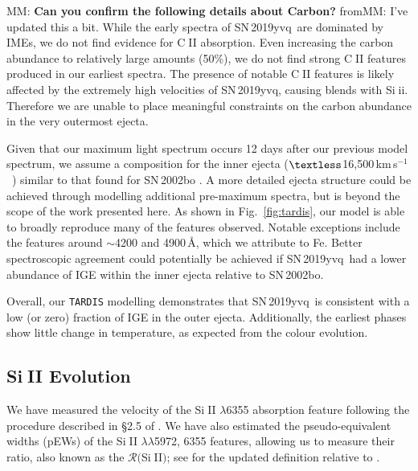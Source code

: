 \documentclass[twocolumn]{aastex63}
\def\ion#1#2{#1$\;${\footnotesize\rm{#2}}\relax}
\newcommand{\magee}[1]{{\color{Rust} MM: \textbf{#1}}}
\newcommand{\frommark}[1]{{\color{orange} fromMM: {#1}}}
\newcommand{\kms}{km\,s$^{-1}$}
\newcommand{\sn}{SN\,2019yvq}
\begin{document}
\magee{Can you confirm the following details about Carbon?} \frommark{I've
updated this a bit.} While the early spectra of \sn\ are dominated by IMEs, we
do not find evidence for \ion{C}{II} absorption. Even increasing the carbon
abundance to relatively large amounts (50\%), we do not find strong
\ion{C}{II} features produced in our earliest spectra. The presence of notable
\ion{C}{II} features is likely affected by the extremely high velocities of
\sn, causing blends with \ion{Si}{ii}. Therefore we are unable to place
meaningful constraints on the carbon abundance in the very outermost ejecta.

Given that our maximum light spectrum occurs 12 days after our previous model
spectrum, we assume a composition for the inner ejecta
($\textless$16,500\,\kms\ ) similar to that found for SN\,2002bo
\citep{Stehle05}. A more detailed ejecta structure could be achieved through
modelling additional pre-maximum spectra, but is beyond the scope of the work
presented here. As shown in Fig.~\ref{fig:tardis}, our model is able to
broadly reproduce many of the features observed. Notable exceptions include
the features around $\sim$4200 and 4900\,\AA, which we attribute to Fe.
Better spectroscopic agreement could potentially be achieved if \sn\ had
a lower abundance of IGE within the inner ejecta relative to SN\,2002bo.

Overall, our \texttt{TARDIS} modelling demonstrates that \sn\ is consistent
with a low (or zero) fraction of IGE in the outer ejecta. Additionally, the
earliest phases show little change in temperature, as expected from the
colour evolution.

\subsection{\ion{Si}{II} Evolution}\label{sec:SiII}

We have measured the velocity of the \ion{Si}{II} $\lambda$6355 absorption
feature following the procedure described in \S2.5 of \citet{Maguire14}. We
have also estimated the pseudo-equivalent widths (pEWs) of the \ion{Si}{II}
$\lambda\lambda$5972, 6355 features, allowing us to measure their ratio, also
known as the $\mathcal{R}($\ion{Si}{II}$)$; see \citet{Hachinger08} for the
updated definition relative to \citet{Nugent95}.
\end{document}
